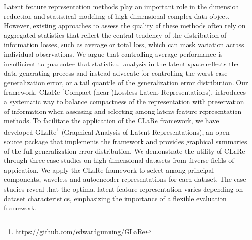 Latent feature representation methods play an important role in the dimension reduction and statistical modeling of high-dimensional complex data object.
However, existing approaches to assess the quality of these methods often rely on aggregated statistics that reflect the central tendency of the distribution of information losses, such as average or total loss, which can mask variation across individual observations.
We argue that controlling average performance is insufficient to guarantee that statistical analysis in the latent space reflects the data-generating process and instead advocate for controlling the worst-case generalization error, or a tail quantile of the generalization error distribution.
Our framework, CLaRe (Compact (near-)Lossless Latent Representations), introduces a systematic way to balance compactness of the representation with preservation of information when assessing and selecting among latent feature representation methods. 
To facilitate the application of the CLaRe framework, we have developed GLaRe\footnote{\url{https://github.com/edwardgunning/GLaRe}} (Graphical Analysis of Latent Representations), an open-source  package that implements the framework and provides graphical summaries of the full generalization error distribution.
We demonstrate the utility of CLaRe through three case studies on high-dimensional datasets from diverse fields of application.
We apply the CLaRe framework to select among principal components, wavelets and autoencoder representations for each dataset.
The case studies reveal that the optimal latent feature representation varies depending on dataset characteristics, emphasizing the importance of a flexible evaluation framework.